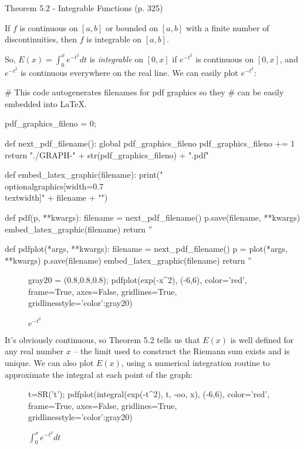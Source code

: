 \begin{framed}
\cite{briggs} Theorem 5.2 - Integrable Functions (p. 325)

If $f$ is continuous on $[a,b]$ or bounded on $[a,b]$ with a finite number of discontinuities,
then $f$ is integrable on $[a,b]$.
\end{framed}

So, $E(x) = \int_0^x e^{-t^2} dt$ is {\it integrable} on $[0,x]$ if $e^{-t^2}$ is continuous on $[0,x]$,
and $e^{-t^2}$ is continuous everywhere on the real line.  We can easily plot $e^{-t^2}$:

\begin{sagecode}
# This code autogenerates filenames for pdf graphics so they
# can be easily embedded into LaTeX.

pdf_graphics_fileno = 0;

def next_pdf_filename():
   global pdf_graphics_fileno
   pdf_graphics_fileno += 1
   return "./GRAPH-" + str(pdf_graphics_fileno) + ".pdf"

def embed_latex_graphic(filename):
   print("\\optionalgraphics[width=0.7\\textwidth]{" + filename + "}")

def pdf(p, **kwargs):
   filename = next_pdf_filename()
   p.save(filename, **kwargs)
   embed_latex_graphic(filename)
   return ''

def pdfplot(*args, **kwargs):
   filename = next_pdf_filename()
   p = plot(*args, **kwargs)
   p.save(filename)
   embed_latex_graphic(filename)
   return ''
\end{sagecode}

\begin{figure}[H]
\begin{center}
\begin{sagecode}
gray20 = (0.8,0.8,0.8);
pdfplot(exp(-x^2), (-6,6), color='red', frame=True, axes=False, gridlines=True, gridlinesstyle={'color':gray20})
\end{sagecode}
\end{center}
\caption{$e^{-t^2}$}
\end{figure}

It's obviously continuous, so Theorem 5.2 tells us that $E(x)$ is well
defined for any real number $x$ -- the limit used to construct the
Riemann sum exists and is unique.  We can also plot $E(x)$, using a
numerical integration routine to approximate the integral at each
point of the graph:

\begin{figure}[H]
\begin{center}
\begin{sagecode}
t=SR('t');
pdfplot(integral(exp(-t^2), t, -oo, x), (-6,6), color='red', frame=True, axes=False, gridlines=True, gridlinesstyle={'color':gray20})
\end{sagecode}
\end{center}
\caption{$\int_0^x e^{-t^2} dt$}
\end{figure}

